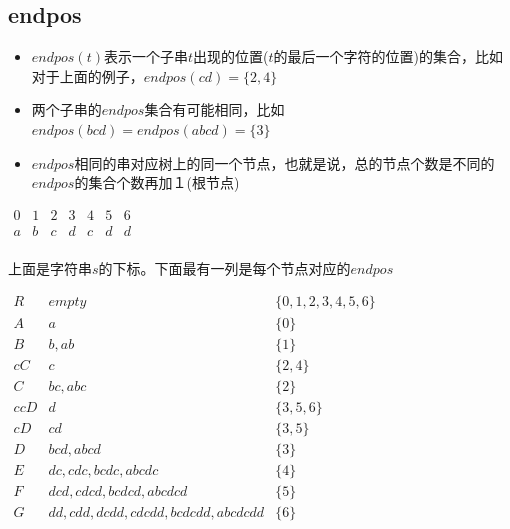 \documentclass{article}
\begin{document}
\subsection{endpos}
\begin{itemize}
	\item $endpos(t)$表示一个子串$t$出现的位置($t$的最后一个字符的位置)的集合，比如对于上面的例子，$endpos(cd)=\{2,4\}$
	\item 两个子串的$endpos$集合有可能相同，比如$endpos(bcd)=endpos(abcd)=\{3\}$
	\item $endpos$相同的串对应树上的同一个节点，也就是说，总的节点个数是不同的$endpos$的集合个数再加１(根节点)
\end{itemize}
$\begin{matrix} 
0 & 1 & 2 &3 & 4 & 5 &6\\ 
a & b & c &d & c & d &d\\ 
\end{matrix}$ \par
上面是字符串$s$的下标。下面最有一列是每个节点对应的$endpos$ \par
$\begin{matrix} 
R & empty & \{0,1,2,3,4,5,6\}\\ 
A & a & \{0\}\\
B & b,ab & \{1\}\\
cC & c & \{2,4\}\\
C & bc,abc & \{2\}\\
ccD & d & \{3,5,6\}\\
cD & cd & \{3,5\}\\
D & bcd,abcd & \{3\}\\
E & dc,cdc,bcdc,abcdc & \{4\}\\
F & dcd,cdcd,bcdcd,abcdcd & \{5\}\\
G & dd,cdd,dcdd,cdcdd,bcdcdd,abcdcdd & \{6\}\\
\end{matrix}$ \par
\end{document}
